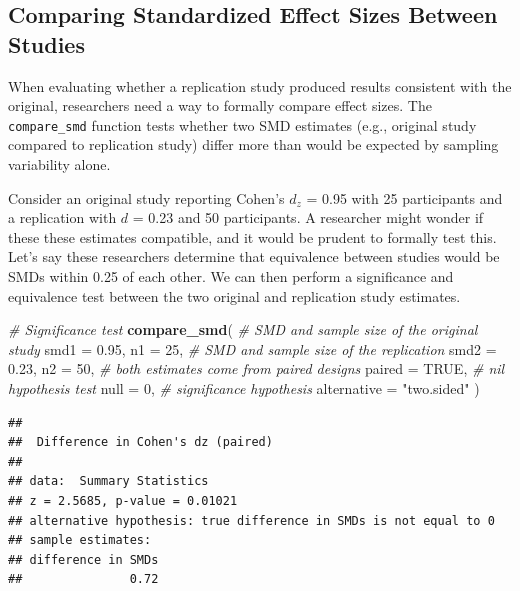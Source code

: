 \documentclass[]{interact}
\theoremstyle{plain}%
\theoremstyle{definition}
\theoremstyle{remark}
\newenvironment{Shaded}{\begin{snugshade}}{\end{snugshade}}
\newcommand{\AttributeTok}[1]{\textcolor[rgb]{0.13,0.29,0.53}{#1}}
\newcommand{\CommentTok}[1]{\textcolor[rgb]{0.56,0.35,0.01}{\textit{#1}}}
\newcommand{\ConstantTok}[1]{\textcolor[rgb]{0.56,0.35,0.01}{#1}}
\newcommand{\DecValTok}[1]{\textcolor[rgb]{0.00,0.00,0.81}{#1}}
\newcommand{\FloatTok}[1]{\textcolor[rgb]{0.00,0.00,0.81}{#1}}
\newcommand{\FunctionTok}[1]{\textcolor[rgb]{0.13,0.29,0.53}{\textbf{#1}}}
\newcommand{\NormalTok}[1]{#1}
\newcommand{\StringTok}[1]{\textcolor[rgb]{0.31,0.60,0.02}{#1}}
\begin{document}
\subsection{Comparing Standardized Effect Sizes Between
Studies}\label{comparing-standardized-effect-sizes-between-studies}

When evaluating whether a replication study produced results consistent
with the original, researchers need a way to formally compare effect
sizes. The \texttt{compare\_smd} function tests whether two SMD
estimates (e.g., original study compared to replication study) differ
more than would be expected by sampling variability alone.

Consider an original study reporting Cohen's \(d_z\) = 0.95 with 25
participants and a replication with \(d\) = 0.23 and 50 participants. A
researcher might wonder if these these estimates compatible, and it
would be prudent to formally test this. Let's say these researchers
determine that equivalence between studies would be SMDs within 0.25 of
each other. We can then perform a significance and equivalence test
between the two original and replication study estimates.

\begin{Shaded}
\begin{Highlighting}[]
\CommentTok{\# Significance test}
\FunctionTok{compare\_smd}\NormalTok{(}
  \CommentTok{\# SMD and sample size of the original study}
  \AttributeTok{smd1 =} \FloatTok{0.95}\NormalTok{,}
  \AttributeTok{n1 =} \DecValTok{25}\NormalTok{,}
  \CommentTok{\# SMD and sample size of the replication}
  \AttributeTok{smd2 =} \FloatTok{0.23}\NormalTok{,}
  \AttributeTok{n2 =} \DecValTok{50}\NormalTok{,}
  \CommentTok{\# both estimates come from paired designs}
  \AttributeTok{paired =} \ConstantTok{TRUE}\NormalTok{,}
  \CommentTok{\# nil hypothesis test}
  \AttributeTok{null =} \DecValTok{0}\NormalTok{,}
  \CommentTok{\# significance hypothesis}
  \AttributeTok{alternative =} \StringTok{"two.sided"}
\NormalTok{)}
\end{Highlighting}
\end{Shaded}

\begin{verbatim}
## 
##  Difference in Cohen's dz (paired)
## 
## data:  Summary Statistics
## z = 2.5685, p-value = 0.01021
## alternative hypothesis: true difference in SMDs is not equal to 0
## sample estimates:
## difference in SMDs 
##               0.72
\end{verbatim}
\end{document}
